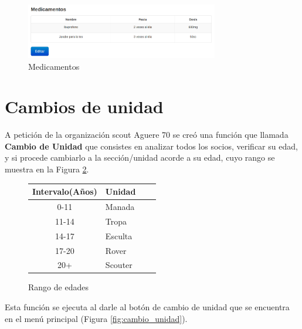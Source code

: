 \begin{figure}[H]
\begin{center}
\includegraphics[width=0.75\textwidth]{images/medicamentos.jpg}
\caption{Medicamentos}
\label{fig:medicamentos}
\end{center}
\end{figure}

\section{Cambios de unidad}
\label{3:sec3}

A petición de la organización scout Aguere 70 se creó una función que llamada \textbf{Cambio de Unidad} que consistes en analizar todos los socios, verificar su edad, y si procede cambiarlo a la sección/unidad acorde a su edad,
cuyo rango se muestra en la Figura \ref{fig:rango}.\\

\begin{figure}[H]
\begin{center}
\begin{tabular}{c|p{25mm}c|p{25mm}|} \hline 
\textbf{Intervalo(Años)} & \textbf{Unidad} \\ \hline
0-11 &
Manada
\\
\hline

11-14 &
Tropa
\\
\hline

14-17 &
Esculta
\\
\hline

17-20 &
Rover
\\
\hline

20+ & 
Scouter
\\
\hline
\end{tabular}
\caption{Rango de edades}
\label{fig:rango}
\end{center}
\end{figure}

Esta función se ejecuta al darle al botón de cambio de unidad que se encuentra en el menú principal (Figura \ref{fig:cambio_unidad}).\\


